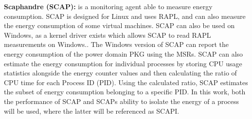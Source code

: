 
\noindent\textbf{Scaphandre (SCAP):} is a monitoring agent able to measure energy consumption.\cite{scaphandre} SCAP is designed for Linux and uses RAPL, and can also measure the energy consumption of some virtual machines. SCAP can also be used on Windows, as a kernel driver exists which allows SCAP to read RAPL measurements on Windows.\cite{RAPL_Windows}. %
The Windows version of SCAP can report the energy consumption of the power domain PKG using the MSRs. SCAP can also estimate the energy consumption for individual processes by storing CPU usage statistics alongside the energy counter values and then calculating the ratio of CPU time for each Process ID (PID). Using the calculated ratio, SCAP estimates the subset of energy consumption belonging to a specific PID. In this work, both the performance of SCAP and SCAPs ability to isolate the energy of a process will be used, where the latter will be referenced as SCAPI.

